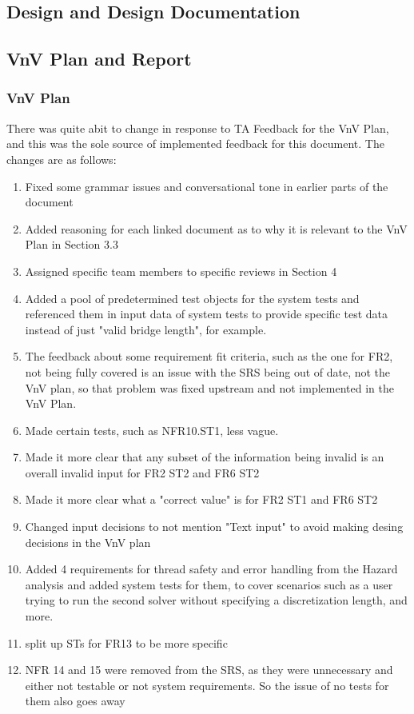 \documentclass{article}
\begin{document}
\subsection{Design and Design Documentation}

\subsection{VnV Plan and Report}

\subsubsection{VnV Plan}
There was quite  abit to change in response to TA Feedback for the VnV Plan, and this was the sole source of implemented feedback for this document. The changes are as follows:
\begin{enumerate}
  \item Fixed some grammar issues and conversational tone in earlier parts of the document
  \item Added reasoning for each linked document as to why it is relevant to the VnV Plan in Section 3.3
  \item Assigned specific team members to specific reviews in Section 4
  \item Added a pool of predetermined test objects for the system tests and referenced them in input data of system tests to provide specific test data instead of just 
  "valid bridge length", for example.
  \item The feedback about some requirement fit criteria, such as the one for FR2, not being fully covered is an issue with the SRS being out of date, not the VnV plan, so that
  problem was fixed upstream and not implemented in the VnV Plan.
  \item Made certain tests, such as NFR10.ST1, less vague.
  \item Made it more clear that any subset of the information being invalid is an overall invalid input for FR2 ST2 and FR6 ST2
  \item Made it more clear what a "correct value" is for FR2 ST1 and FR6 ST2
  \item Changed input decisions to not mention "Text input" to avoid making desing decisions in the VnV plan
  \item Added 4 requirements for thread safety and error handling from the Hazard analysis and added system tests for them, to cover scenarios such as a user trying to run the 
  second solver without specifying a discretization length, and more.
  \item split up STs for FR13 to be more specific
  \item NFR 14 and 15 were removed from the SRS, as they were unnecessary and either not testable or not system requirements. So the issue of no tests for them also goes away
\end{enumerate}
\end{document}

